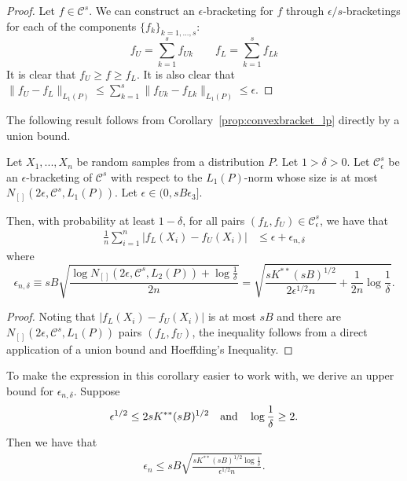 \begin{proof}
Let $f \in \mathcal{C}^s$. We can construct an $\epsilon$-bracketing for $f$ through $\epsilon/s$-bracketings for each of the components $\{ f_k \}_{k=1,...,s}$:
\[f_U = \sum_{k=1}^s f_{Uk}  \qquad f_L = \sum_{k=1}^s f_{Lk} \]
It is clear that $f_U \geq f \geq f_L$. It is also clear that $\| f_U - f_L \|_{L_1(P)} \leq \sum_{k=1}^s \| f_{Uk} - f_{Lk} \|_{L_1(P)} \leq \epsilon$.
\end{proof}


The following result follows from Corollary~\ref{prop:convexbracket_lp} directly by a union bound. 

\begin{corollary}
\label{cor:convexbracket_ln}
Let $X_1,...,X_n$ be random samples from a distribution $P$. Let $1 > \delta > 0$. Let $\mathcal{C}^s_\epsilon$ be an $\epsilon$-bracketing of $\mathcal{C}^s$ with respect to the $L_1(P)$-norm whose size is at most $N_{[]}( 2\epsilon, \mathcal{C}^s, L_1(P))$. Let $\epsilon \in (0, s B \epsilon_3]$.

Then, with probability at least $1-\delta$, for all pairs $(f_L, f_U) \in \mathcal{C}^s_\epsilon$, we have that
\begin{align*}
\frac{1}{n} \sum_{i=1}^n |f_L(X_i) - f_U(X_i)| &\leq \epsilon + \epsilon_{n, \delta}
\end{align*}
where 
$$\epsilon_{n,\delta} \equiv 
sB \sqrt{ \frac{ \log N_{[]}(2\epsilon, \mathcal{C}^s, L_2(P)) + \log \frac{1}{\delta}}{2n}} 
= \sqrt{ \frac{ sK^{**}(sB)^{1/2}}{2\epsilon^{1/2}n} + \frac{1}{2n} \log \frac{1}{\delta}}.$$
\end{corollary}

\begin{proof}
Noting that $|f_L(X_i) - f_U(X_i)|$ is at most $sB$ and there are
$N_{[]}(2\epsilon, \mathcal{C}^s, L_1(P))$ pairs $(f_L, f_U)$, the
inequality follows from a direct application of a union bound and Hoeffding's Inequality.
\end{proof}

To make the expression in this corollary easier to work with, we derive an upper bound for $\epsilon_{n, \delta}$. Suppose 
\begin{align}
\epsilon^{1/2} \leq 2sK^{**} (sB)^{1/2} \quad \textrm{and} \quad \log \frac{1}{\delta} \geq 2 \label{cond:simplify_covering_number}.
\end{align}
Then we have that
\begin{align*}
\epsilon_n \leq sB \sqrt{ \frac{ sK^{**} (sB)^{1/2} \log \frac{1}{\delta}}{\epsilon^{1/2}n}}.
\end{align*}

